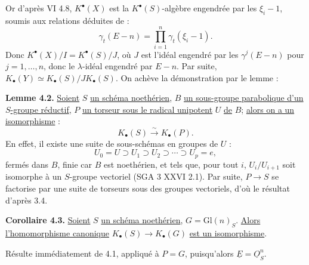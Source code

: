 
Or d'après VI 4.8, $K^{\bullet}(X)$ est la $K^{\bullet}(S)$-algèbre
engendrée par les $\xi_i-1$, soumis aux relations déduites de :
\[
\gamma_t(E-n)=\prod_{i=1}^n\gamma_t(\xi_i-1).
\]
Donc $K^{\bullet}(X)/I=K^{\bullet}(S)/J$, où $J$ est l'idéal engendré par les $\gamma^j(E-n)$ pour $j=1,\ldots,n$, donc le $\lambda$-idéal engendré par $E-n$. Par suite,
$K_\bullet(Y)\simeq K_\bullet(S)/J K_\bullet(S)$. On achève la démonstration par le lemme :

\textbf{Lemme 4.2.} \uline{Soient} $S$ \uline{un schéma noethérien}, $B$ \uline{un sous-groupe parabolique d'un} $S$\uline{-groupe réductif}, $P$ \uline{un torseur sous le radical unipotent} $U$ \uline{de} $B$; \uline{alors on a un isomorphisme} :
\[
K_\bullet(S)\xrightarrow{\sim}K_\bullet(P).
\]
En effet, il existe une suite de sous-schémas en groupes de $U$ :
\[
U_0=U\supset U_1\supset U_2\supset\cdots\supset U_p=e,
\]
fermés dans $B$, finie car $B$ est noethérien, et tels que, pour tout $i$, $U_i/U_{i+1}$ soit isomorphe à un $S$-groupe vectoriel (SGA 3 XXVI 2.1). Par suite, $P\to S$ se factorise par une suite de torseurs sous des groupes vectoriels, d'où le résultat d'après 3.4.

\textbf{Corollaire 4.3.} \uline{Soient} $S$ \uline{un schéma noethérien}, $G=\mathrm{Gl}(n)_S$. \uline{Alors l'homomorphisme canonique} $K_\bullet(S)\longrightarrow K_\bullet(G)$ \uline{est un isomorphisme}.

Résulte immédiatement de 4.1, appliqué à $P=G$, puisqu'alors $\underline{E}=\underline{O}_S^n$.

